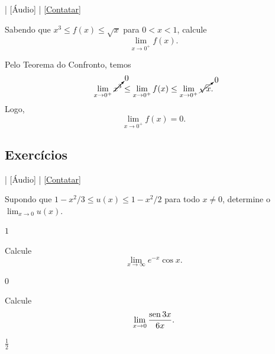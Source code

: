\begin{flushright}
  [Vídeo] | [Áudio] | \href{https://phkonzen.github.io/notas/contato.html}{[Contatar]}
\end{flushright}

\begin{exeresol}
  Sabendo que $x^3 \leq f(x) \leq \sqrt{x}$ para $0 < x < 1$, calcule
  \begin{equation}
    \lim_{x\to 0^+} f(x).
  \end{equation}
\end{exeresol}
\begin{resol}
  Pelo Teorema do Confronto, temos
  \begin{equation}
    \lim_{x\to 0^+} \cancelto{0}{x^3} \leq \lim_{x\to 0^+} f(x) \leq \lim_{x\to 0^+} \cancelto{0}{\sqrt{x}}.
  \end{equation}
  Logo,
  \begin{equation}
    \lim_{x\to 0^+} f(x) = 0.
  \end{equation}
\end{resol}

\emconstrucao

\subsection*{Exercícios}

\begin{flushright}
  [Vídeo] | [Áudio] | \href{https://phkonzen.github.io/notas/contato.html}{[Contatar]}
\end{flushright}

\begin{exer}
  Supondo que $1-x^2/3 \leq u(x) \leq 1-x^2/2$ para todo $x\neq 0$, determine o $\lim_{x\to 0} u(x)$.
\end{exer}
\begin{resp}
  $1$
\end{resp}

\begin{exer}
  Calcule
  \begin{equation}
    \lim_{x\to \infty} e^{-x}\cos x.
  \end{equation}
\end{exer}
\begin{resp}
  $0$
\end{resp}

\begin{exer}
  Calcule
  \begin{equation}
    \lim_{x\to 0} \frac{\operatorname{sen} 3x}{6x}.
  \end{equation}
\end{exer}
\begin{resp}
  $\frac{1}{2}$
\end{resp}

